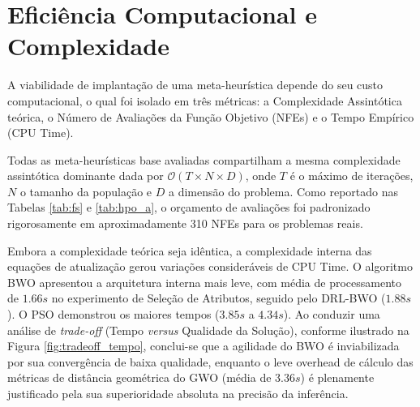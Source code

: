 \documentclass[12pt, a4paper, oneside]{report}
\begin{document}
\section{Eficiência Computacional e Complexidade}

A viabilidade de implantação de uma meta-heurística depende do seu custo computacional, o qual foi isolado em três métricas: a Complexidade Assintótica teórica, o Número de Avaliações da Função Objetivo (NFEs) e o Tempo Empírico (CPU Time).

Todas as meta-heurísticas base avaliadas compartilham a mesma complexidade assintótica dominante dada por $\mathcal{O}(T \times N \times D)$, onde $T$ é o máximo de iterações, $N$ o tamanho da população e $D$ a dimensão do problema. Como reportado nas Tabelas \ref{tab:fs} e \ref{tab:hpo_a}, o orçamento de avaliações foi padronizado rigorosamente em aproximadamente 310 NFEs para os problemas reais.

Embora a complexidade teórica seja idêntica, a complexidade interna das equações de atualização gerou variações consideráveis de CPU Time. O algoritmo BWO apresentou a arquitetura interna mais leve, com média de processamento de $1.66s$ no experimento de Seleção de Atributos, seguido pelo DRL-BWO ($1.88s$). O PSO demonstrou os maiores tempos ($3.85s$ a $4.34s$). Ao conduzir uma análise de \textit{trade-off} (Tempo \textit{versus} Qualidade da Solução), conforme ilustrado na Figura \ref{fig:tradeoff_tempo}, conclui-se que a agilidade do BWO é inviabilizada por sua convergência de baixa qualidade, enquanto o leve overhead de cálculo das métricas de distância geométrica do GWO (média de $3.36s$) é plenamente justificado pela sua superioridade absoluta na precisão da inferência.
\end{document}
